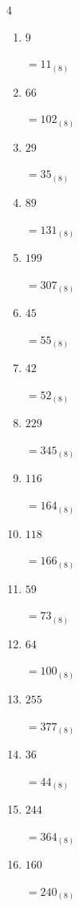 \begin{multicols}{4}
\begin{enumerate}
        $=367_{(8)}$

  \item $9$

        $=11_{(8)}$

  \item $66$

        $=102_{(8)}$

  \item $29$

        $=35_{(8)}$

  \item $89$

        $=131_{(8)}$

  \item $199$

        $=307_{(8)}$

  \item $45$

        $=55_{(8)}$

  \item $42$

        $=52_{(8)}$

\columnbreak %

  \item $229$

        $=345_{(8)}$

  \item $116$

        $=164_{(8)}$

  \item $118$

        $=166_{(8)}$

  \item $59$

        $=73_{(8)}$

  \item $64$

        $=100_{(8)}$

  \item $255$

        $=377_{(8)}$

  \item $36$

        $=44_{(8)}$

  \item $244$

        $=364_{(8)}$

  \item $160$

        $=240_{(8)}$


\end{enumerate}
\end{multicols}
